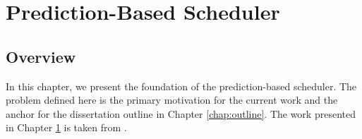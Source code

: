 \chapter{Prediction-Based Scheduler}\label{chap:prediction_based_scheduler}

\section{Overview}
\label{pbs:overview}
In this chapter, we present the foundation of the prediction-based scheduler. The problem defined here is the primary motivation for the current work and the anchor for the dissertation outline in Chapter \ref{chap:outline}. The work presented in Chapter \ref{chap:prediction_based_scheduler} is taken from \cite{ravan_ensuring_2020}.






















